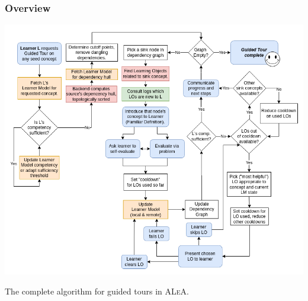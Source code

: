 \documentclass[aspectratio=169, usenames, dvipsnames]{beamer}
\def\ALeA{\textsc{ALeA}\xspace}
\begin{document}
\begin{frame}
\frametitle{Overview}
\begin{minipage}{0.7\textwidth}
\vspace*{-10px}
\includegraphics[height=0.9\textheight,keepaspectratio]{images/gt_algorithm_square}
\end{minipage}%
\begin{minipage}{0.3\textwidth}
The complete algorithm for guided tours in \ALeA.
\end{minipage}%
\end{frame}
\end{document}
